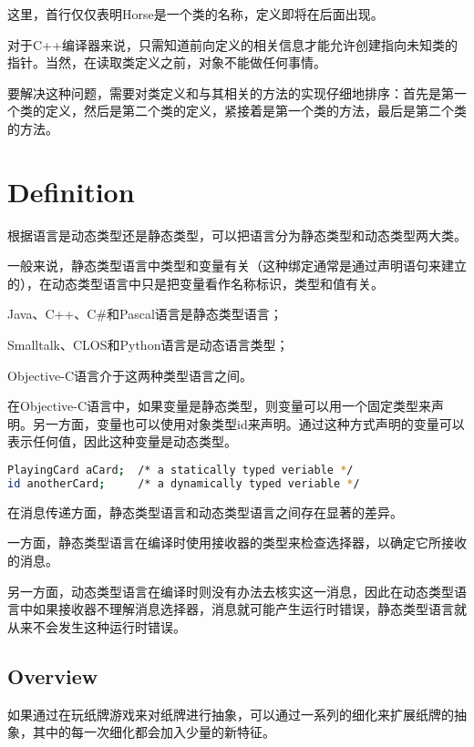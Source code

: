 这里，首行仅仅表明Horse是一个类的名称，定义即将在后面出现。

对于C++编译器来说，只需知道前向定义的相关信息才能允许创建指向未知类的指针。当然，在读取类定义之前，对象不能做任何事情。

要解决这种问题，需要对类定义和与其相关的方法的实现仔细地排序：首先是第一个类的定义，然后是第二个类的定义，紧接着是第一个类的方法，最后是第二个类的方法。

\chapter{Definition}

根据语言是动态类型还是静态类型，可以把语言分为静态类型和动态类型两大类。

一般来说，静态类型语言中类型和变量有关（这种绑定通常是通过声明语句来建立的），在动态类型语言中只是把变量看作名称标识，类型和值有关。

\begin{compactitem}
\item Java、C++、C\#和Pascal语言是静态类型语言；
\item Smalltalk、CLOS和Python语言是动态语言类型；
\item Objective-C语言介于这两种类型语言之间。
\end{compactitem}

在Objective-C语言中，如果变量是静态类型，则变量可以用一个固定类型来声明。另一方面，变量也可以使用对象类型id来声明。通过这种方式声明的变量可以表示任何值，因此这种变量是动态类型。

\begin{lstlisting}[language=bash]
PlayingCard aCard;	/* a statically typed veriable */
id anotherCard;		/* a dynamically typed veriable */
\end{lstlisting}

在消息传递方面，静态类型语言和动态类型语言之间存在显著的差异。

一方面，静态类型语言在编译时使用接收器的类型来检查选择器，以确定它所接收的消息。

另一方面，动态类型语言在编译时则没有办法去核实这一消息，因此在动态类型语言中如果接收器不理解消息选择器，消息就可能产生运行时错误，静态类型语言就从来不会发生这种运行时错误。

\section{Overview}

如果通过在玩纸牌游戏来对纸牌进行抽象，可以通过一系列的细化来扩展纸牌的抽象，其中的每一次细化都会加入少量的新特征。


